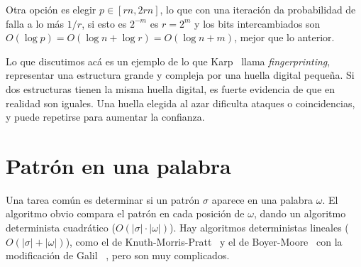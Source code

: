   Otra opción es elegir \(p \in [ r n, 2 r n]\),
  lo que con una iteración da probabilidad de falla a lo más \(1/r\),
  si esto es \(2^{-m}\) es \(r = 2^m\)
  y los bits intercambiados
  son \(O(\log p) = O(\log n + \log r) = O(\log n + m)\),
  mejor que lo anterior.

  Lo que discutimos acá es un ejemplo de lo que Karp~%
    \cite{karp91:_intro_randomized_algorithms}
  llama \emph{\foreignlanguage{english}{fingerprinting}},
  representar una estructura grande y compleja
  por una huella digital pequeña.
  Si dos estructuras tienen la misma huella digital,
  es fuerte evidencia de que en realidad son iguales.
  Una huella elegida al azar dificulta ataques o coincidencias,
  y puede repetirse para aumentar la confianza.

\section{Patrón en una palabra}
\label{sec:patron}

  Una tarea común es determinar si un patrón \(\sigma\)
  aparece en una palabra \(\omega\).
  El algoritmo obvio compara el patrón en cada posición de \(\omega\),
  dando un algoritmo determinista cuadrático
  (\(O(\lvert \sigma \rvert \cdot \lvert \omega \rvert)\)).
  Hay algoritmos deterministas lineales
  (\(O(\lvert \sigma \rvert + \lvert \omega \rvert)\)),
  como el de Knuth-Morris-Pratt~%
    \cite{knuth77:_fast_pattern_match_strings}
  y el de Boyer-Moore~%
    \cite{boyer77:_fast_string_search_algor}
  con la modificación de Galil~%
    \cite{galil79:_improving_worst_case_running_time},
  pero son muy complicados.


